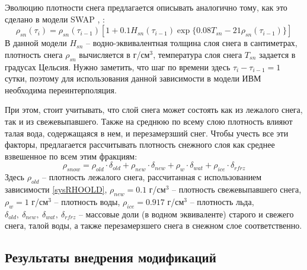 \documentclass[a4paper, fontsize=14pt]{scrartcl}
\begin{document}
Эволюцию плотности снега предлагается описывать аналогично тому, как это сделано в модели SWAP \cite{Gusev2002}, \cite{YOSIDA1955}:
\begin{equation}
    \rho_{sn}(\tau_i) = \rho_{sn}(\tau_{i-1}) \left[  1 + 0.1 H_{sn}(\tau_{i-1}) \exp \{ 0.08 T_{sn} - 21 \rho_{sn}(\tau_{i-1})  \} \right]    \label{sysRHOOLD}  
\end{equation}
В данной модели $H_{sn}$ -- водно-эквивалентная толщина слоя снега в сантиметрах, плотность снега $\rho_{sn}$ вычисляется в г/см$^3$, температура слоя снега $T_{sn}$ задается в градусах Цельсия. Нужно заметить, что шаг по времени здесь $\tau_{i} - \tau_{i-1} = 1$ сутки, поэтому для использования данной зависимости в модели ИВМ необходима переинтерполяция.

При этом, стоит учитывать, что слой снега может состоять как из лежалого снега, так и из свежевыпавшего. Также на среднюю по всему слою плотность влияют талая вода, содержащаяся в нем, и перезамерзший снег. Чтобы учесть все эти факторы, предлагается рассчитывать плотность снежного слоя как среднее взвешенное по всем этим фракциям:
\begin{equation}
    \rho_{snow} = \rho_{old} \cdot \delta_{old} + \rho_{new} \cdot \delta_{new} + \rho_{w} \cdot \delta_{wat} + \rho_{ice} \cdot \delta_{rfrz}
\end{equation}
Здесь $\rho_{old}$ -- плотность лежалого снега, рассчитанная с использованием зависимости \eqref{sysRHOOLD},  $\rho_{new} = 0.1$ г/см$^3$ -- плотность свежевыпавшего снега, $\rho_{w} = 1$ г/см$^3$ -- плотность воды, $\rho_{ice} = 0.917$ г/см$^3$ -- плотность льда, $\delta_{old}, ~\delta_{new}, ~\delta_{wat}, ~\delta_{rfrz}$ -- массовые доли (в водном эквиваленте) старого и свежего снега, талой воды, а также перезамерзшего снега в снежном слое соответственно.


\subsection{Результаты внедрения модификаций}
\end{document}
